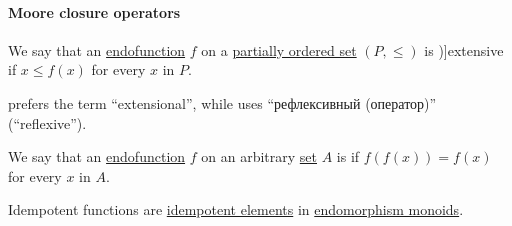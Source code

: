\paragraph{Moore closure operators}

\begin{definition}\label{def:extensive_function}
  We say that an \hyperref[def:function/endofunction]{endofunction} \( f \) on a \hyperref[def:partially_ordered_set]{partially ordered set} \( (P, \leq) \) is \term[en=extensive (\cite[111]{Birkhoff1967Lattices})]{extensive} if \( x \leq f(x) \) for every \( x \) in \( P \).
\end{definition}
\begin{comments}
  \item {} prefers the term \enquote{extensional}, while  uses \enquote{рефлексивный (оператор)} (\enquote{reflexive}).
\end{comments}

\begin{definition}\label{def:idempotent_function}
  We say that an \hyperref[def:function/endofunction]{endofunction} \( f \) on an arbitrary \hyperref[def:set]{set} \( A \) is  if \( f(f(x)) = f(x) \) for every \( x \) in \( A \).
\end{definition}
\begin{comments}
  \item Idempotent functions are \hyperref[def:monoid_idempotent]{idempotent elements} in \hyperref[def:endomorphism_monoid]{endomorphism monoids}.
\end{comments}

